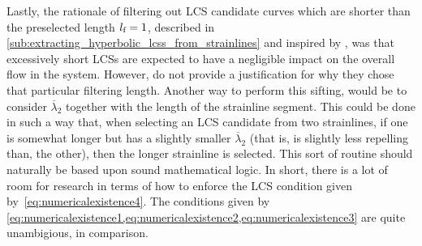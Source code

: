 Lastly, the rationale of filtering out LCS candidate curves which are shorter
than the preselected length $l_{\textnormal{f}}=1$, described in
\cref{sub:extracting_hyperbolic_lcss_from_strainlines} and inspired by
\textcite{farazmand2012computing}, was that excessively short LCSs are
expected to have a negligible impact on the overall flow in the system.
However, \citeauthor{farazmand2012computing} do not provide a justification
for why they chose that particular filtering length. Another way to perform this
sifting, would be to consider $\overline{\lambda}_{2}$ together with the length
of the strainline segment. This could be done in such a way that, when selecting
an LCS candidate from two strainlines, if one is somewhat longer but has a
slightly smaller $\overline{\lambda}_{2}$ (that is, is slightly less repelling
than, the other), then the longer strainline is selected. This sort of routine
should naturally be based upon sound mathematical logic. In short, there is a
lot of room for research in terms of how to enforce the LCS condition given
by~\cref{eq:numericalexistence4}. The conditions given by
\cref{eq:numericalexistence1,eq:numericalexistence2,eq:numericalexistence3}
are quite unambigious, in comparison.

